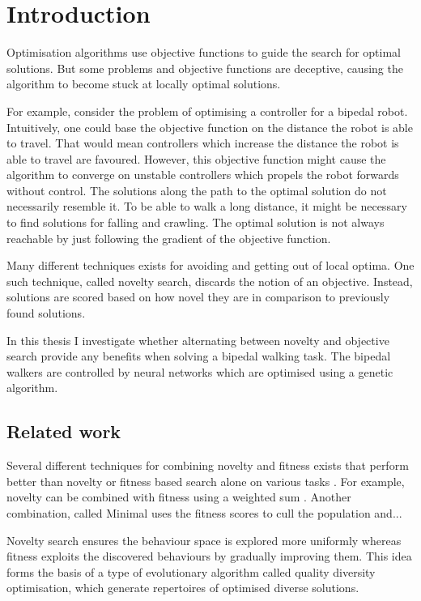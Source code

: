\section{Introduction}



\label{sec:intro}

Optimisation algorithms use objective functions to guide the search for optimal solutions.
But some problems and objective functions are deceptive, causing the algorithm to become stuck at
locally optimal solutions.

For example, consider the problem of optimising a controller for a bipedal
robot. Intuitively, one could base the objective function on the distance the robot is able to travel.
That would mean controllers which increase the distance the robot is able to travel are favoured.
However, this objective function might cause the algorithm to converge on unstable controllers which
propels the robot forwards without control. The solutions along the path to the optimal solution
do not necessarily resemble it. To be able to walk a long distance, it might be necessary to find
solutions for falling and crawling. The optimal solution is not always reachable by just
following the gradient of the objective function.

Many different techniques exists for avoiding and getting out of local optima. One such technique, called
novelty search, discards the notion of an objective. Instead, solutions are scored based on how novel
they are in comparison to previously found solutions.

In this thesis I investigate whether alternating between novelty and objective search provide any
benefits when solving a bipedal walking task. The bipedal walkers are controlled by neural networks
which are optimised using a genetic algorithm.

\todo{}


\subsection{Related work}
Several different techniques for combining novelty and fitness exists that perform better than novelty or
fitness based search alone on various tasks \cite{ns_study}. For example, novelty can be combined with fitness using a weighted sum \cite{}.
Another combination, called Minimal  uses the fitness scores to cull the population and...

Novelty search ensures the behaviour space is explored more uniformly whereas fitness exploits the discovered behaviours
by gradually improving them. This idea forms the basis of a type of evolutionary algorithm called quality diversity optimisation,
which generate repertoires of optimised diverse solutions.


